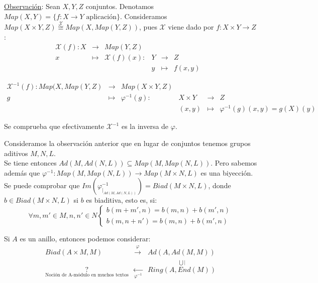 \documentclass[11pt,a4paper]{article}
\theoremstyle{break}
\begin{document}
\underline{Observación}: Sean $X, Y, Z$ conjuntos. Denotamos $Map(X, Y) = \{f: X \to Y \text{ aplicación}\}$. Consideramos $Map(X \times Y, Z) \overset{\mathcal{X}}{\cong} Map(X, Map(Y, Z))$, pues $\mathcal{X}$ viene dado por $f:X \times Y \to Z$:
$$\begin{aligned}
\mathcal{X}(f): X & \to         & Map(Y, Z) &          &    &              &          \\
                       x & \mapsto & \mathcal{X}(f)(x): & Y & \to         & Z       \\
                          &               &                            & y & \mapsto & f(x, y)
\end{aligned}$$

\begin{scriptsize}
$$\begin{aligned}
\mathcal{X}^{-1}(f): Map(X, Map(Y, Z) & \to          & Map(X \times Y, Z) &                   &               &              & \\
                                        g                & \mapsto & \varphi^{-1}(g):      & X \times Y & \to          & Z       \\
                                                          &               &                               & (x, y)          & \mapsto & \varphi^{-1}(g)(x, y) = g(X)(y)
\end{aligned}$$
\end{scriptsize}

Se comprueba que efectivamente $\mathcal{X}^{-1}$ es la inversa de $\varphi	$.

Consideramos la observación anterior que en lugar de conjuntos tenemos grupos aditivos $M, N, L$. \\
Se tiene entonces $Ad(M, Ad(N, L)) \subseteq Map(M, Map(N, L))$. Pero sabemos además que $\varphi^{-1}: Map(M, Map(N, L)) \to Map(M \times N, L)$ es una biyección. \\
Se puede comprobar que $Im(\varphi^{-1}_{\mid_{Ad(M, Ad(N, L))}}) = Biad(M \times N, L)$, donde $b \in Biad(M \times N, L)$ si $b$ es biaditiva, esto es, si:
$$\forall m, m' \in M, n, n' \in N
\begin{cases}
b(m + m', n) = b(m, n) + b(m', n) \\
b(m, n + n') = b(m, n) + b(m', n)
\end{cases}$$

Si $A$ es un anillo, entonces podemos considerar:
$$\begin{aligned}
Biad(A \times M, M) & \overset{\varphi}{\to} & Ad(A, Ad(M, M)) \\
\underset{\text{Noción de A-módulo en muchos textos}}{?} & \underset{\varphi^{-1}}{\leftarrow} & \overset{\bigcup \mid}{Ring(A, End(M))}
\end{aligned}$$
\end{document}
